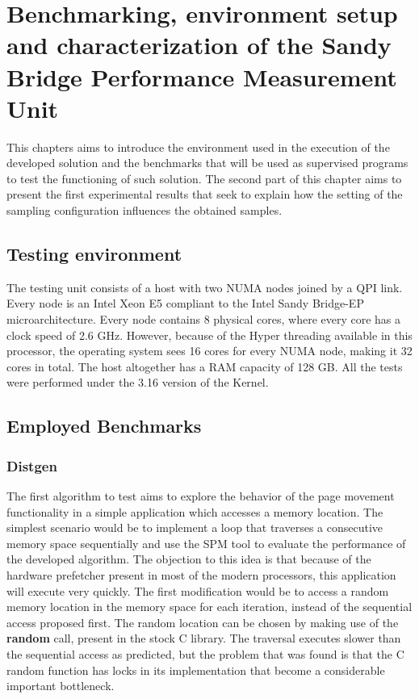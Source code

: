 \chapter[Benchmarking, environment setup and characterization of the Performance Measurement Unit]{Benchmarking, environment setup and characterization of the Sandy Bridge Performance Measurement Unit}\label{chapter:envsetup}

This chapters aims to introduce the environment used in the execution of the developed solution and the benchmarks that will be used as supervised programs to test the functioning of such solution. The second part of this chapter aims to present the first experimental results that seek to explain how the setting of the sampling configuration influences the obtained samples.

\section{Testing environment}\label{section:runningenv}
The testing unit consists of a host with two NUMA nodes joined by a QPI link. Every node is an Intel Xeon E5 compliant to the Intel Sandy Bridge-EP microarchitecture. Every node contains 8 physical cores, where every core has a clock speed of 2.6 GHz. However, because of the Hyper threading available in this processor, the operating system sees 16 cores for every NUMA node, making it 32 cores in total. The host altogether has a RAM capacity of 128 GB. All the tests were performed under the 3.16 version of the Kernel.

\section{Employed Benchmarks}\label{section:emplybmchs}

\subsection{Distgen}\label{section:distgen}
The first algorithm to test aims to explore the behavior of the page movement functionality in a simple application which accesses a memory location. The simplest scenario would be to implement a loop that traverses a consecutive memory space sequentially and use the SPM tool to evaluate the performance of the developed algorithm. The objection to this idea is that because of the hardware prefetcher present in most of the modern processors, this application will execute very quickly. The first modification would be to access a random memory location in the memory space for each iteration, instead of the sequential access proposed first. The random location can be chosen by making use of the \textbf{random} call, present in the stock C library. The traversal executes slower than the sequential access as predicted, but the problem that was found is that the C random function has locks in its implementation that become a considerable important bottleneck.

